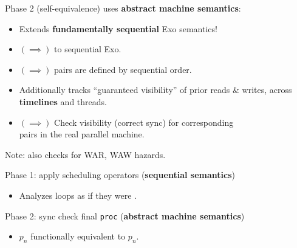\newpage
{}

{\LARGE
Phase 2 (self-equivalence) uses \textbf{abstract machine semantics}:
\begin{itemize}
  \item {\color{lightgray} Extends \textbf{fundamentally sequential} Exo semantics!}
  \item $(\implies)$  to sequential Exo.
  \item $(\implies)$  pairs are defined by sequential order.
  \item {\color{lightgray} Additionally tracks ``guaranteed visibility'' of prior reads \& writes, across \textbf{timelines} and threads.}
  \item $(\implies)$ Check visibility (correct sync) for corresponding\\ pairs in the real parallel machine.
\end{itemize}

\vfill

\hfill Note: also checks for WAR, WAW hazards.

}


\newpage
{}

{\LARGE
Phase 1: apply scheduling operators (\textbf{sequential semantics})
\begin{itemize}
  \item Analyzes  loops as if they were .
\end{itemize}

Phase 2: sync check final \texttt{proc} (\textbf{abstract machine semantics})
\begin{itemize}
  \item {} $p_n$ functionally equivalent to  $p_n$.
\end{itemize}
}

\begin{center}
{\large
{}
}
\end{center}


